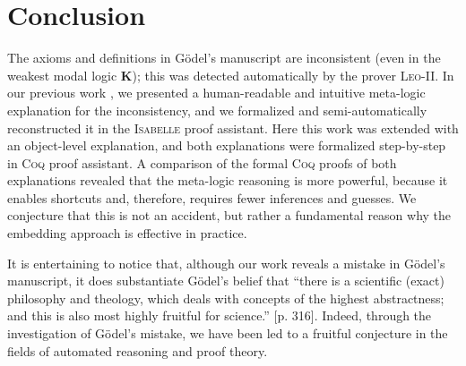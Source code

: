 \documentclass{llncs}
\newcommand{\logic}[1]{\textbf{#1}\xspace}
\newcommand{\K}{\logic{K}}
\begin{document}
\section{Conclusion}\label{sec:conclusion}


The axioms and definitions in G\"odel's manuscript are inconsistent (even in the weakest modal logic \K);
this was detected automatically by the prover
\textsc{Leo-II}. In our previous work \cite{C55}, we presented a human-readable and intuitive meta-logic explanation for the inconsistency, and we formalized and semi-automatically reconstructed it in the \textsc{Isabelle} proof assistant. Here this work was extended with an object-level explanation, and both explanations were formalized step-by-step in \textsc{Coq} proof assistant. A comparison of the formal \textsc{Coq} proofs of both explanations revealed that the meta-logic reasoning is more powerful, because it enables shortcuts and, therefore, requires fewer inferences and guesses. We conjecture that this is not an accident, but rather a fundamental reason why the embedding approach is effective in practice. 

It is entertaining to notice that, although our work reveals a mistake in G\"odel's manuscript, it does substantiate G\"odel's belief that 
``there is a scientific (exact) philosophy and theology,
which deals with concepts of the highest abstractness; 
and this is also most highly fruitful for science.'' \cite{Wang1996}[p. 316]. Indeed, through the investigation of G\"odel's mistake, we have been led to a fruitful conjecture in the fields of automated reasoning and proof theory.





\end{document}
